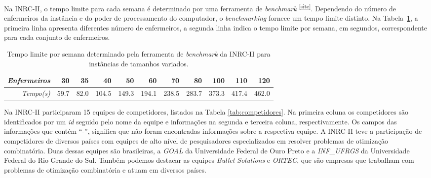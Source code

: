 \documentclass[cic,tc, twoside]{iiufrgs}
\begin{document}
Na INRC-II, o tempo limite para cada semana é determinado por uma ferramenta de \textit{benchmark} \textsuperscript{\ref{site}}. Dependendo do número de enfermeiros da instância e do poder de processamento do computador, o \textit{benchmarking} fornece um tempo limite distinto. Na Tabela~\ref{tab:instances}, a primeira linha apresenta diferentes número de enfermeiros, a segunda linha indica o tempo limite por semana, em segundos, correspondente para cada conjunto de enfermeiros.

\begin{table}[ht!]
\caption{Tempo limite por semana determinado pela ferramenta de \textit{benchmark} da INRC-II para instâncias de tamanhos variados.}
\medskip
\small
\label{tab:instances}
\centering
\begin{tabular}{r|rrrrrrrrrr}
\textit{Enfermeiros} & 30 & 35 & 40 & 50 & 60 & 70 & 80 & 100 & 110 & 120 \\
\hline
\textit{Tempo(s)} &  59.7 & 82.0 & 104.5 & 149.3 & 194.1 & 238.5 & 283.7 & 373.3 & 417.4 & 462.0    \\
\end{tabular}
\end{table}

Na INRC-II participaram 15 equipes de competidores, listados na Tabela \ref{tab:competidores}. Na primeira coluna os competidores são identificados por um \emph{id} seguido pelo nome da equipe e informações na segunda e terceira coluna, respectivamente. Os campos das informações que contém ``-'', significa que não foram encontradas informações sobre a respectiva equipe.
A INRC-II teve a participação de competidores de diversos países com equipes de alto nível de pesquisadores especializados em resolver problemas de otimização combinatória. 
Duas dessas equipes são brasileiras, a \emph{GOAL} da Universidade Federal de Ouro Preto e a \emph{INF\_UFRGS} da Universidade Federal do Rio Grande do Sul. Também podemos destacar as equipes \emph{Bullet Solutions} e \emph{ORTEC}, que são empresas que trabalham com problemas de otimização combinatória e atuam em diversos países.
\end{document}
